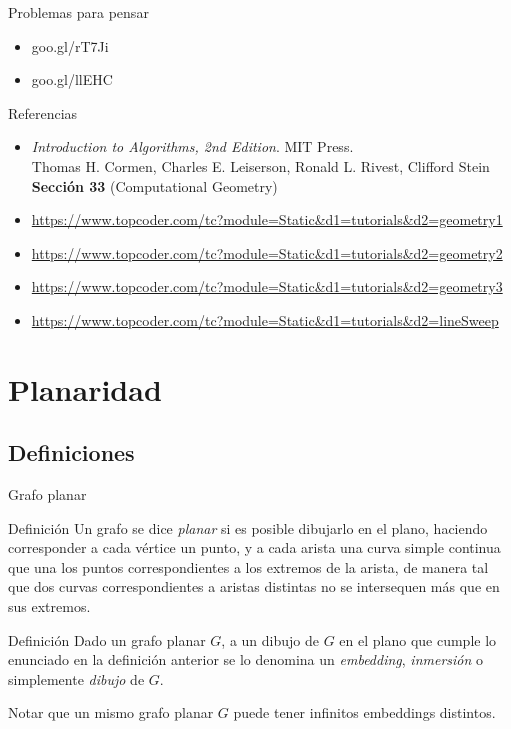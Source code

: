 \documentclass[compress]{beamer}
\begin{document}
\begin{frame}{Problemas para pensar}

\begin{itemize}
\item goo.gl/rT7Ji
\item goo.gl/llEHC
\end{itemize}

\end{frame}

\begin{frame}{Referencias}
   \begin{itemize}
   \item \textit{Introduction to Algorithms, 2nd Edition}. MIT Press. \\ Thomas H. Cormen, Charles E. Leiserson, Ronald L. Rivest, Clifford Stein \\
   \textbf{Sección 33} (Computational Geometry)
   \item \url{https://www.topcoder.com/tc?module=Static&d1=tutorials&d2=geometry1}
   \item \url{https://www.topcoder.com/tc?module=Static&d1=tutorials&d2=geometry2}
   \item \url{https://www.topcoder.com/tc?module=Static&d1=tutorials&d2=geometry3}
   \item \url{https://www.topcoder.com/tc?module=Static&d1=tutorials&d2=lineSweep}
  \end{itemize}
  
\end{frame}

\section{Planaridad}

\subsection{Definiciones}

\begin{frame}{Grafo planar}

\begin{block}{Definición}
    Un grafo se dice \textit{planar} si es posible dibujarlo en el plano, haciendo corresponder a cada vértice un punto, y a cada arista una curva simple continua que una los puntos correspondientes a los extremos de la arista, de manera tal que dos curvas correspondientes a aristas distintas no se intersequen más que en sus extremos.
\end{block}

\begin{block}{Definición}
    Dado un grafo planar $G$, a un dibujo de $G$ en el plano que cumple lo enunciado en la definición anterior se lo denomina un \textit{embedding}, \textit{inmersión} o simplemente \textit{dibujo} de $G$.
\end{block}

Notar que un mismo grafo planar $G$ puede tener infinitos embeddings distintos.

\end{frame}
\end{document}
